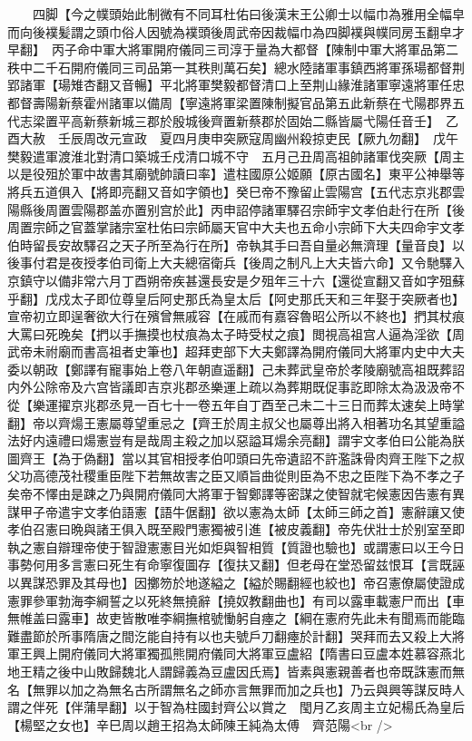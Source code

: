 　　四脚【今之幞頭始此制微有不同耳杜佑曰後漢末王公卿士以幅巾為雅用全幅皁而向後襆髪謂之頭巾俗人因號為襆頭後周武帝因裁幅巾為四脚襆與幞同房玉翻皁才早翻】　丙子命中軍大將軍開府儀同三司淳于量為大都督【陳制中軍大將軍品第二秩中二千石開府儀同三司品第一其秩則萬石矣】總水陸諸軍事鎮西將軍孫瑒都督荆郢諸軍【瑒雉杏翻又音暢】平北將軍樊毅都督清口上至荆山緣淮諸軍寧遠將軍任忠都督壽陽新蔡霍州諸軍以備周【寧遠將軍梁置陳制擬官品第五此新蔡在弋陽郡界五代志梁置平高新蔡新城三郡於殷城後齊置新蔡郡於固始二縣皆屬弋陽任音壬】　乙酉大赦　壬辰周改元宣政　夏四月庚申突厥寇周幽州殺掠吏民【厥九勿翻】　戊午樊毅遣軍渡淮北對清口築城壬戍清口城不守　五月己丑周高祖帥諸軍伐突厥【周主以是役殂於軍中故書其廟號帥讀曰率】遣柱國原公姬願【原古國名】東平公神舉等將兵五道俱入【將即亮翻又音如字領也】癸巳帝不豫留止雲陽宫【五代志京兆郡雲陽縣後周置雲陽郡盖亦置别宫於此】丙申詔停諸軍驛召宗師宇文孝伯赴行在所【後周置宗師之官蓋掌諸宗室杜佑曰宗師屬天官中大夫也五命小宗師下大夫四命宇文孝伯時留長安故驛召之天子所至為行在所】帝執其手曰吾自量必無濟理【量音良】以後事付君是夜授孝伯司衛上大夫總宿衛兵【後周之制凡上大夫皆六命】又令馳驛入京鎮守以備非常六月丁酉朔帝疾甚還長安是夕殂年三十六【還從宣翻又音如字殂蘇乎翻】戊戍太子即位尊皇后阿史那氏為皇太后【阿史那氏天和三年娶于突厥者也】宣帝初立即逞奢欲大行在殯曾無戚容【在戚而有嘉容魯昭公所以不終也】捫其杖痕大罵曰死晚矣【捫以手撫摸也杖痕為太子時受杖之痕】閲視高祖宫人逼為淫欲【周武帝未祔廟而書高祖者史筆也】超拜吏部下大夫鄭譯為開府儀同大將軍内史中大夫委以朝政【鄭譯有寵事始上卷八年朝直遥翻】己未葬武皇帝於孝陵廟號高祖既葬詔内外公除帝及六宫皆議即吉京兆郡丞樂運上疏以為葬期既促事訖即除太為汲汲帝不從【樂運擢京兆郡丞見一百七十一卷五年自丁酉至己未二十三日而葬太速矣上時掌翻】帝以齊煬王憲屬尊望重忌之【齊王於周主叔父也屬尊出將入相著功名其望重謚法好内遠禮曰煬憲豈有是哉周主殺之加以惡謚耳煬余亮翻】謂宇文孝伯曰公能為朕圖齊王【為于偽翻】當以其官相授孝伯叩頭曰先帝遺詔不許濫誅骨肉齊王陛下之叔父功高德茂社稷重臣陛下若無故害之臣又順旨曲從則臣為不忠之臣陛下為不孝之子矣帝不懌由是踈之乃與開府儀同大將軍于智鄭譯等密謀之使智就宅候憲因告憲有異謀甲子帝遣宇文孝伯語憲【語牛倨翻】欲以憲為太師【太師三師之首】憲辭讓又使孝伯召憲曰晩與諸王俱入既至殿門憲獨被引進【被皮義翻】帝先伏壯士於别室至即執之憲自辯理帝使于智證憲憲目光如炬與智相質【質證也驗也】或謂憲曰以王今日事勢何用多言憲曰死生有命寧復圖存【復扶又翻】但老母在堂恐留兹恨耳【言既誣以異謀恐罪及其母也】因擲笏於地遂縊之【縊於賜翻經也絞也】帝召憲僚屬使證成憲罪參軍勃海李綱誓之以死終無撓辭【撓奴教翻曲也】有司以露車載憲尸而出【車無帷盖曰露車】故吏皆散唯李綱撫棺號慟躬自瘞之【綱在憲府先此未有聞焉而能臨難盡節於所事隋唐之間汔能自持有以也夫號戶刀翻瘞於計翻】哭拜而去又殺上大將軍王興上開府儀同大將軍獨孤熊開府儀同大將軍豆盧紹【隋書曰豆盧本姓慕容燕北地王精之後中山敗歸魏北人謂歸義為豆盧因氏焉】皆素與憲親善者也帝既誅憲而無名【無罪以加之為無名古所謂無名之師亦言無罪而加之兵也】乃云與興等謀反時人謂之伴死【伴蒲旱翻】以于智為柱國封齊公以賞之　閠月乙亥周主立妃楊氏為皇后【楊堅之女也】辛巳周以趙王招為太師陳王純為太傅　齊范陽<br />
